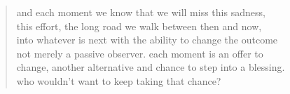 \begin{verse}
and each moment we know that we will miss this sadness, \\
this effort, the long road we walk between then and now, \\
into whatever is next with the ability to change the outcome \\
not merely a passive observer. each moment is an offer to \\
change, another alternative and chance to step into a blessing. \\
who wouldn't want to keep taking that chance? 
\end{verse}
